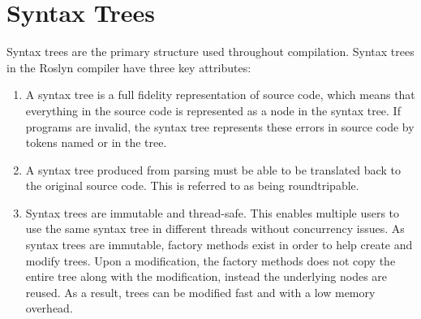 \section{Syntax Trees}\label{sec:syntax_trees}
Syntax trees are the primary structure used throughout compilation. Syntax trees in the Roslyn compiler have three key attributes\cite[p. 6]{ng2012roslyn}:
\begin{enumerate}
	\item A syntax tree is a full fidelity representation of source code, which means that everything in the source code is represented as a node in the syntax tree. If programs are invalid, the syntax tree represents these errors in source code by tokens named  or  in the tree.
	\item A syntax tree produced from parsing must be able to be translated back to the original source code. This is referred to as being roundtripable.
	\item Syntax trees are immutable and thread-safe. This enables multiple users to use the same syntax tree in different threads without concurrency issues. As syntax trees are immutable, factory methods exist in order to help create and modify trees. Upon a modification, the factory methods does not copy the entire tree along with the modification, instead the underlying nodes are reused. As a result, trees can be modified fast and with a low memory overhead.
\end{enumerate}

